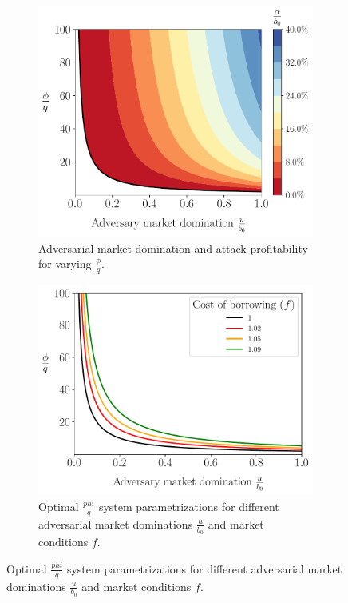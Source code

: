 \begin{figure}[htb]
  \centering
  \begin{subfigure}{0.49\textwidth}
    \centering
    \includegraphics[width=\textwidth]{./plots/plotu.pdf}
    \caption{Adversarial market domination and attack profitability
             for varying $\frac{\phi}{q}$.}
    \label{fig:plotu}
  \end{subfigure}
  \hfill
  \begin{subfigure}{0.49\textwidth}
    \centering
    \includegraphics[width=\textwidth]{./plots/multiplef_plotu.pdf}
    \caption{Optimal $\frac{phi}{q}$ system parametrizations
             for different adversarial market dominations $\frac{u}{b_0}$
             and market conditions $f$.}
    \label{fig:compare-f-plotu}
  \end{subfigure}
\end{figure}


